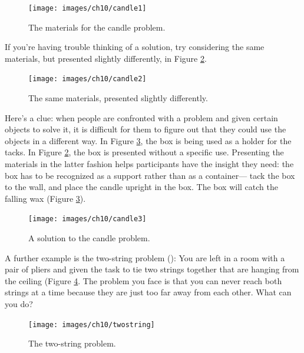 \documentclass[
]{krantz}
\begin{document}
\begin{figure}

{\centering \texttt{[image: images/ch10/candle1]} 

}

\caption{The materials for the candle problem.}\label{fig:candle1}
\end{figure}

If you're having trouble thinking of a solution, try considering the same materials, but presented slightly differently, in Figure \ref{fig:candle2}.

\begin{figure}

{\centering \texttt{[image: images/ch10/candle2]} 

}

\caption{The same materials, presented slightly differently.}\label{fig:candle2}
\end{figure}

Here's a clue: when people are confronted with a problem and given certain objects to solve it, it is difficult for them to figure out that they could use the objects in a different way. In Figure \ref{fig:candle3}, the box is being used as a holder for the tacks. In Figure \ref{fig:candle2}, the box is presented without a specific use. Presenting the materials in the latter fashion helps participants have the insight they need: the box has to be recognized as a support rather than as a container--- tack the box to the wall, and place the candle upright in the box. The box will catch the falling wax (Figure \ref{fig:candle3}).

\begin{figure}

{\centering \texttt{[image: images/ch10/candle3]} 

}

\caption{A solution to the candle problem.}\label{fig:candle3}
\end{figure}

A further example is the two-string problem (): You are left in a room with a pair of pliers and given the task to tie two strings together that are hanging from the ceiling (Figure \ref{fig:twostring}. The problem you face is that you can never reach both strings at a time because they are just too far away from each other. What can you do?

\begin{figure}

{\centering \texttt{[image: images/ch10/twostring]} 

}

\caption{The two-string problem.}\label{fig:twostring}
\end{figure}
\end{document}
